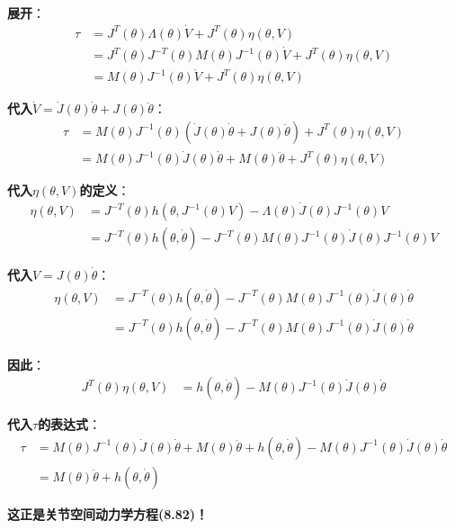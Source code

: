 \documentclass[12pt,a4paper]{article}
\begin{document}
\textbf{展开}：
\begin{align}
\tau &= J^T(\theta)\Lambda(\theta)\dot{V} + J^T(\theta)\eta(\theta, V) \\
&= J^T(\theta)J^{-T}(\theta)M(\theta)J^{-1}(\theta)\dot{V} + J^T(\theta)\eta(\theta, V) \\
&= M(\theta)J^{-1}(\theta)\dot{V} + J^T(\theta)\eta(\theta, V)
\end{align}

\textbf{代入$\dot{V} = \dot{J}(\theta)\dot{\theta} + J(\theta)\ddot{\theta}$}：
\begin{align}
\tau &= M(\theta)J^{-1}(\theta)(\dot{J}(\theta)\dot{\theta} + J(\theta)\ddot{\theta}) + J^T(\theta)\eta(\theta, V) \\
&= M(\theta)J^{-1}(\theta)\dot{J}(\theta)\dot{\theta} + M(\theta)\ddot{\theta} + J^T(\theta)\eta(\theta, V)
\end{align}

\textbf{代入$\eta(\theta, V)$的定义}：
\begin{align}
\eta(\theta, V) &= J^{-T}(\theta)h(\theta, J^{-1}(\theta)V) - \Lambda(\theta)\dot{J}(\theta)J^{-1}(\theta)V \\
&= J^{-T}(\theta)h(\theta, \dot{\theta}) - J^{-T}(\theta)M(\theta)J^{-1}(\theta)\dot{J}(\theta)J^{-1}(\theta)V
\end{align}

\textbf{代入$V = J(\theta)\dot{\theta}$}：
\begin{align}
\eta(\theta, V) &= J^{-T}(\theta)h(\theta, \dot{\theta}) - J^{-T}(\theta)M(\theta)J^{-1}(\theta)\dot{J}(\theta)\dot{\theta} \\
&= J^{-T}(\theta)h(\theta, \dot{\theta}) - J^{-T}(\theta)M(\theta)J^{-1}(\theta)\dot{J}(\theta)\dot{\theta}
\end{align}

\textbf{因此}：
\begin{align}
J^T(\theta)\eta(\theta, V) &= h(\theta, \dot{\theta}) - M(\theta)J^{-1}(\theta)\dot{J}(\theta)\dot{\theta}
\end{align}

\textbf{代入$\tau$的表达式}：
\begin{align}
\tau &= M(\theta)J^{-1}(\theta)\dot{J}(\theta)\dot{\theta} + M(\theta)\ddot{\theta} + h(\theta, \dot{\theta}) - M(\theta)J^{-1}(\theta)\dot{J}(\theta)\dot{\theta} \\
&= M(\theta)\ddot{\theta} + h(\theta, \dot{\theta})
\end{align}

\textbf{这正是关节空间动力学方程(8.82)！}
\end{document}
